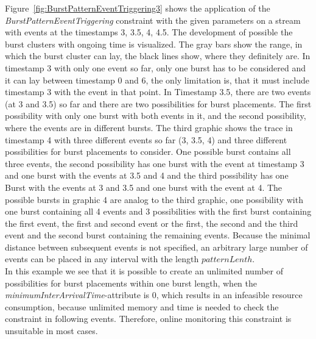 Figure~\ref{fig:BurstPatternEventTriggering3} shows the application of the \emph{BurstPatternEventTriggering} constraint with the given parameters on a stream with events at the timestamps 3, 3.5, 4, 4.5. The development of possible the burst clusters with ongoing time is visualized. The gray bars show the range, in which the burst cluster can lay, the black lines show, where they definitely are. In timestamp 3 with only one event so far, only one burst has to be considered and it can lay between timestamp 0 and 6, the only limitation is, that it must include timestamp 3 with the event in that point. In Timestamp 3.5, there are two events (at 3 and 3.5) so far and there are two possibilities for burst placements. The first possibility with only one burst with both events in it, and the second possibility, where the events are in different bursts. The third graphic shows the trace in timestamp 4 with three different events so far (3, 3.5, 4) and three different possibilities for burst placements to consider. One possible burst contains all three events, the second possibility has one burst with the event at timestamp 3 and one burst with the events at 3.5 and 4 and the third possibility has one Burst with the events at 3 and 3.5 and one burst with the event at 4. The possible bursts in graphic 4 are analog to the third graphic, one possibility with one burst containing all 4 events and 3 possibilities with the first burst containing the first event, the first and second event or the first, the second and the third event and the second burst containing the remaining events. Because the minimal distance between subsequent events is not specified, an arbitrary large number of events can be placed in any interval with the length $patternLenth$.\\
In this example we see that it is possible to create an unlimited number of possibilities for burst placements within one burst length, when the \textit{minimumInterArrivalTime}-attribute is 0, which results in an infeasible resource consumption, because unlimited memory and time is needed to check the constraint in following events. Therefore, online monitoring this constraint is unsuitable in most cases.

